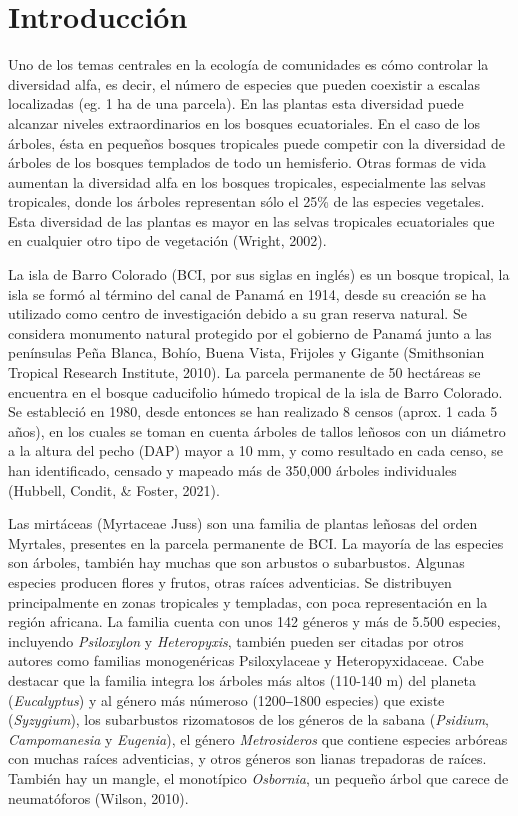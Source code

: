 \documentclass[11pt,]{article}
\begin{document}
\vskip 6.5pt


\noindent  \section{Introducción}\label{introducciuxf3n}

Uno de los temas centrales en la ecología de comunidades es cómo
controlar la diversidad alfa, es decir, el número de especies que pueden
coexistir a escalas localizadas (eg. 1 ha de una parcela). En las
plantas esta diversidad puede alcanzar niveles extraordinarios en los
bosques ecuatoriales. En el caso de los árboles, ésta en pequeños
bosques tropicales puede competir con la diversidad de árboles de los
bosques templados de todo un hemisferio. Otras formas de vida aumentan
la diversidad alfa en los bosques tropicales, especialmente las selvas
tropicales, donde los árboles representan sólo el 25\% de las especies
vegetales. Esta diversidad de las plantas es mayor en las selvas
tropicales ecuatoriales que en cualquier otro tipo de vegetación
(Wright, 2002).

La isla de Barro Colorado (BCI, por sus siglas en inglés) es un bosque
tropical, la isla se formó al término del canal de Panamá en 1914, desde
su creación se ha utilizado como centro de investigación debido a su
gran reserva natural. Se considera monumento natural protegido por el
gobierno de Panamá junto a las penínsulas Peña Blanca, Bohío, Buena
Vista, Frijoles y Gigante (Smithsonian Tropical Research Institute,
2010). La parcela permanente de 50 hectáreas se encuentra en el bosque
caducifolio húmedo tropical de la isla de Barro Colorado. Se estableció
en 1980, desde entonces se han realizado 8 censos (aprox. 1 cada 5
años), en los cuales se toman en cuenta árboles de tallos leñosos con un
diámetro a la altura del pecho (DAP) mayor a 10 mm, y como resultado en
cada censo, se han identificado, censado y mapeado más de 350,000
árboles individuales (Hubbell, Condit, \& Foster, 2021).

Las mirtáceas (Myrtaceae Juss) son una familia de plantas leñosas del
orden Myrtales, presentes en la parcela permanente de BCI. La mayoría de
las especies son árboles, también hay muchas que son arbustos o
subarbustos. Algunas especies producen flores y frutos, otras raíces
adventicias. Se distribuyen principalmente en zonas tropicales y
templadas, con poca representación en la región africana. La familia
cuenta con unos 142 géneros y más de 5.500 especies, incluyendo
\emph{Psiloxylon} y \emph{Heteropyxis}, también pueden ser citadas por
otros autores como familias monogenéricas Psiloxylaceae y
Heteropyxidaceae. Cabe destacar que la familia integra los árboles más
altos (110-140 m) del planeta (\emph{Eucalyptus}) y al género más
númeroso (1200‒1800 especies) que existe (\emph{Syzygium}), los
subarbustos rizomatosos de los géneros de la sabana (\emph{Psidium},
\emph{Campomanesia} y \emph{Eugenia}), el género \emph{Metrosideros} que
contiene especies arbóreas con muchas raíces adventicias, y otros
géneros son lianas trepadoras de raíces. También hay un mangle, el
monotípico \emph{Osbornia}, un pequeño árbol que carece de neumatóforos
(Wilson, 2010).
\end{document}
